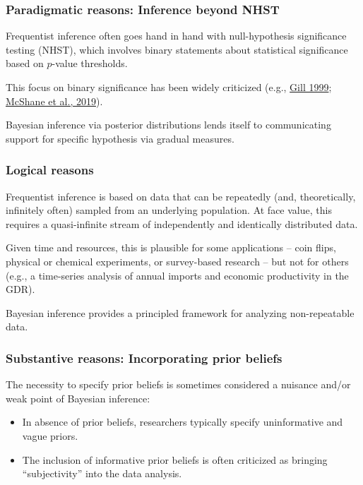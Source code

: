 \documentclass[
  11pt,
]{article}
\providecommand{\tightlist}{%
  \setlength{\itemsep}{0pt}\setlength{\parskip}{0pt}}
\begin{document}
\hypertarget{paradigmatic-reasons-inference-beyond-nhst}{%
\subsubsection{Paradigmatic reasons: Inference beyond NHST}\label{paradigmatic-reasons-inference-beyond-nhst}}

Frequentist inference often goes hand in hand with null-hypothesis
significance testing (NHST), which involves binary statements about
statistical significance based on \(p\)-value thresholds.

This focus on binary significance has been widely criticized (e.g.,
\href{https://www.jstor.org/stable/449153}{Gill 1999}; \href{https://www.tandfonline.com/doi/full/10.1080/00031305.2018.1527253}{McShane et al.,
2019}).

Bayesian inference via posterior distributions lends itself to
communicating support for specific hypothesis via gradual measures.

\hypertarget{logical-reasons}{%
\subsubsection{Logical reasons}\label{logical-reasons}}

Frequentist inference is based on data that can be repeatedly (and,
theoretically, infinitely often) sampled from an underlying population.
At face value, this requires a quasi-infinite stream of independently
and identically distributed data.

Given time and resources, this is plausible for some applications --
coin flips, physical or chemical experiments, or survey-based research
-- but not for others (e.g., a time-series analysis of annual imports
and economic productivity in the GDR).

Bayesian inference provides a principled framework for analyzing
non-repeatable data.

\hypertarget{substantive-reasons-incorporating-prior-beliefs}{%
\subsubsection{Substantive reasons: Incorporating prior beliefs}\label{substantive-reasons-incorporating-prior-beliefs}}

The necessity to specify prior beliefs is sometimes considered a
nuisance and/or weak point of Bayesian inference:

\begin{itemize}
\tightlist
\item
  In absence of prior beliefs, researchers typically specify
  uninformative and vague priors.
\item
  The inclusion of informative prior beliefs is often criticized as
  bringing ``subjectivity'' into the data analysis.
\end{itemize}
\end{document}

